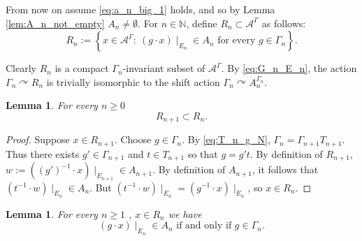 \documentclass[oneside,english]{amsart}
\newtheorem{lem}[thm]{Lemma}
\theoremstyle{definition}
\newcommand{\AAA}{\mathcal{A}}
\newcommand{\ZZ}{\mathbb{Z}}
\newcommand{\act}[2]{{#1} \curvearrowright {#2}}
\begin{document}
From now on assume \eqref{eq:a_n_big_1} holds, and so by Lemma \ref{lem:A_n_not_empty} $A_n \ne \emptyset$.
For $n \in \mathbb{N}$, define $R_n \subset \AAA^\Gamma$ as follows:
\begin{equation}\label{eq:R_n_def}
R_n := \left\{ x \in \AAA^\Gamma:~ (g \cdot x)\mid_{E_n} \in A_n\mbox{ for every } g \in \Gamma_n\right\}.
\end{equation}

Clearly $R_n$ is a compact $\Gamma_n$-invariant subset of $\AAA^\Gamma$. By \eqref{eq:G_n_E_n},  the action $\act{\Gamma_n}{R_n}$  is trivially isomorphic to the shift action $\act{\Gamma_n}{A_n^{\Gamma_n}}$.

\begin{lem}\label{lem:R_n_nested}
For every $n \ge 0$
$$R_{n+1} \subset R_{n}.$$
\end{lem}
\begin{proof}
Suppose $x \in R_{n+1}$.  Choose $g \in \Gamma_{n}$. By \eqref{eq:T_n_g_N}, $\Gamma_{n} =  \Gamma_{n+1}T_{n+1}$. Thus there exists $g' \in \Gamma_{n+1}$ and $t \in T_{n+1}$ so that $g= g't$.
By definition of $R_{n+1}$, $w := ((g')^{-1} \cdot x )\mid_{E_{n+1}} \in A_{n+1}$. By definition of $A_{n+1}$, it follows that $(t^{-1} \cdot w) \mid_{E_{n}} \in A_{n}$. But
$(t^{-1} \cdot w ) \mid_{E_{n}} = (g^{-1} \cdot x )\mid_{E_{n}}$, so $x \in R_{n}$.
\end{proof}

\begin{lem}\label{lem:R_n_trans_disjoint}
For every $n \ge 1$ , $x \in R_n$ we have
\begin{equation}\label{eq:R_n_trans_distjoint}
(g \cdot x )\mid_{E_n} \in A_n \mbox{ if and only if } g \in \Gamma_n.
\end{equation}
\end{lem}
\end{document}
